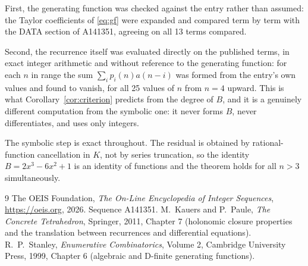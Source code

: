 \documentclass[11pt,a4paper]{article}
\theoremstyle{plain}
\theoremstyle{definition}
\begin{document}
First, the generating function was checked against the entry rather than assumed: the
Taylor coefficients of \eqref{eq:gf} were expanded and compared term by term with the DATA
section of A141351, agreeing on all 13 terms compared.

Second, the recurrence itself was evaluated directly on the published terms, in exact
integer arithmetic and without reference to the generating function: for each $n$ in range
the sum $\sum_{i}p_{i}(n)a(n-i)$ was formed from the entry's own values and found to
vanish, for all 25 values of $n$ from $n=4$ upward. This is what
Corollary~\ref{cor:criterion} predicts from the degree of $B$, and it is a genuinely
different computation from the symbolic one: it never forms $B$, never differentiates, and
uses only integers.

The symbolic step is exact throughout. The residual is obtained by rational-function
cancellation in $K$, not by series truncation, so the identity $B=2 x^{3} - 6 x^{2} + 1$ is an
identity of functions and the theorem holds for all $n>3$ simultaneously.

\begin{thebibliography}{9}
 The OEIS Foundation, \emph{The On-Line Encyclopedia of Integer Sequences},
\url{https://oeis.org}, 2026. Sequence A141351.
 M.~Kauers and P.~Paule, \emph{The Concrete Tetrahedron}, Springer, 2011,
Chapter 7 (holonomic closure properties and the translation between recurrences and
differential equations).
 R.~P.~Stanley, \emph{Enumerative Combinatorics}, Volume 2, Cambridge
University Press, 1999, Chapter 6 (algebraic and D-finite generating functions).
\end{thebibliography}
\end{document}

